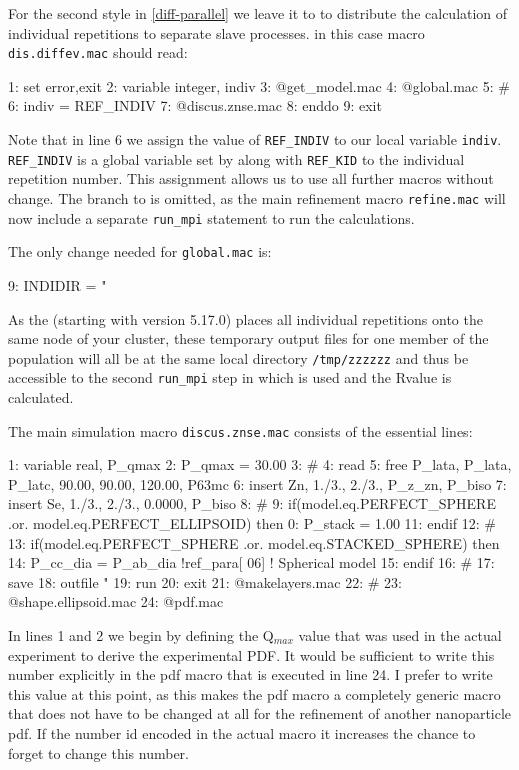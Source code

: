 For the second style in \ref{diff-parallel} we leave it to \Diffev to distribute
the calculation of individual repetitions to separate slave processes. in this case
macro {\tt dis.diffev.mac} should read:
\begin{MacVerbatim}
 1: set error,exit
 2: variable integer, indiv
 3: @get_model.mac
 4: @global.mac
 5: #
 6: indiv = REF_INDIV
 7:   @discus.znse.mac
 8: enddo
 9: exit
\end{MacVerbatim}
Note that in line 6 we assign the value of {\tt REF\_INDIV} to our local variable
{\tt indiv}. {\tt REF\_INDIV} is a global variable set by \Diffev along with 
{\tt REF\_KID} to the individual repetition number. This assignment allows us to
use all further macros without change. The branch to \Kuplot is omitted, as the
main refinement macro {\tt refine.mac} will now include a separate {\tt run\_mpi}
statement to run the \Kuplot calculations. 

The only change needed for {\tt global.mac} is:
\begin{MacVerbatim}
 9: INDIDIR   = "%
\end{MacVerbatim}
As the \Suite (starting with version 5.17.0) places all individual repetitions
onto the same node of your cluster, these temporary output files for one 
member of the population will all be at the same local directory {\tt /tmp/zzzzzz}
and thus be accessible to the second {\tt run\_mpi} step in which 
\Kuplot is used and the Rvalue is calculated. 


The main simulation macro {\tt discus.znse.mac} consists of the essential lines:
\begin{MacVerbatim}
 1: variable real, P_qmax
 2: P_qmax      = 30.00
 3: #
 4: read
 5:    free P_lata, P_lata, P_latc, 90.00, 90.00, 120.00, P63mc
 6: insert Zn, 1./3., 2./3., P_z_zn, P_biso
 7: insert Se, 1./3., 2./3., 0.0000, P_biso
 8: #
 9: if(model.eq.PERFECT_SPHERE .or. model.eq.PERFECT_ELLIPSOID) then
 0:    P_stack  = 1.00
11: endif
12: #
13: if(model.eq.PERFECT_SPHERE .or. model.eq.STACKED_SPHERE) then
14:    P_cc_dia     = P_ab_dia  !ref_para[ 06]    ! Spherical model
15: endif
16: #
17: save
18:   outfile "%
19:   run
20: exit
21: @makelayers.mac
22: #
23: @shape.ellipsoid.mac
24: @pdf.mac
\end{MacVerbatim}

In lines 1 and 2 we begin by defining the Q$_{max}$ value that was used in the 
actual experiment to derive the experimental PDF. It would be sufficient to
write this number explicitly in the pdf macro that is executed in line 24.
I prefer to write this value at this point, as this makes the pdf macro a
completely generic macro that does not have to be changed at all for the
refinement of another nanoparticle pdf. If the number id encoded in the actual 
macro it increases the chance to forget to change this number.

